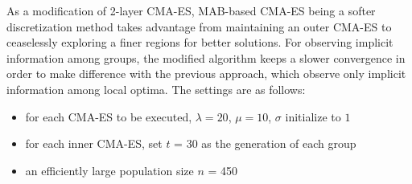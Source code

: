 As a modification of 2-layer CMA-ES, MAB-based CMA-ES being a softer
discretization method takes advantage from maintaining an outer CMA-ES
to ceaselessly exploring a finer regions for better solutions.
For observing implicit information among groups, the modified algorithm
keeps a slower convergence in order to make difference with the previous
approach, which observe only implicit information among local optima.
The settings are as follows:
\begin{itemize}
  \item{for each CMA-ES to be executed, $\lambda = 20$,
      $\mu=10$, $\sigma$ initialize to $1$}
  \item{for each inner CMA-ES, set $t$ = 30 as the generation of each
    group}
  \item{an efficiently large population size $n$ = 450}
\end{itemize}


